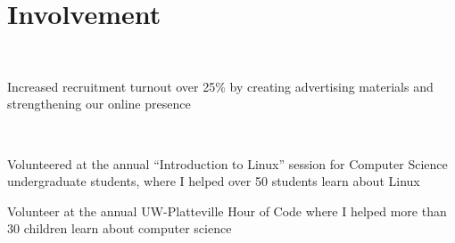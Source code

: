 \documentclass[]{hieudo-build}
\begin{document}
\begin{minipage}[t]{0.64\textwidth}


\section{Involvement}

 \\
\begin{tightemize}
\item Increased recruitment turnout over 25\% by creating advertising materials and strengthening our online presence
\end{tightemize}
\sectionsep

 \\
\begin{tightemize}
\item Volunteered at the annual “Introduction to Linux” session for Computer Science undergraduate students, where I helped over 50 students learn about Linux
\item Volunteer at the annual UW-Platteville Hour of Code where I helped more than 30 children learn about computer science
\end{tightemize}
\sectionsep


\end{minipage}
\end{document}
